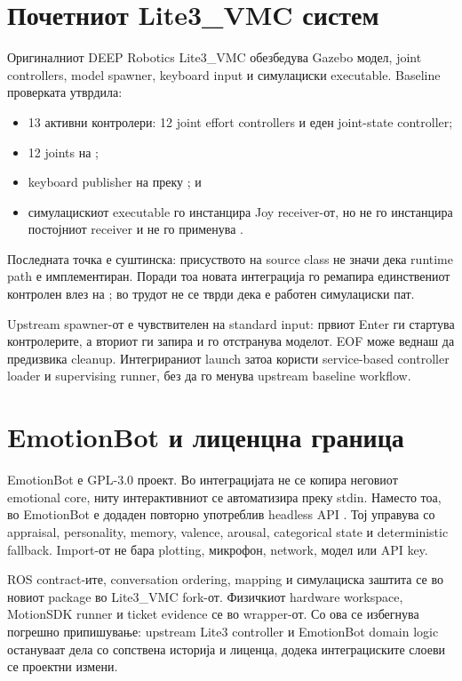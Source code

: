 \section{Почетниот Lite3\_VMC систем}

Оригиналниот DEEP Robotics Lite3\_VMC обезбедува Gazebo модел, joint
controllers, model spawner, keyboard input и симулациски executable. Baseline
проверката утврдила:

\begin{itemize}
  \item 13 активни контролери: 12 joint effort controllers и еден
  joint-state controller;
  \item 12 joints на ;
  \item keyboard publisher на  преку ; и
  \item симулацискиот executable го инстанцира Joy receiver-от, но не го
  инстанцира постојниот  receiver и не го применува
  .
\end{itemize}

Последната точка е суштинска: присуството на source class не значи дека
runtime path е имплементиран. Поради тоа новата интеграција го ремапира
единствениот контролен влез на ; во трудот не се
тврди дека  е работен симулациски пат.

Upstream spawner-от е чувствителен на standard input: првиот Enter ги стартува
контролерите, а вториот ги запира и го отстранува моделот. EOF може веднаш да
предизвика cleanup. Интегрираниот launch затоа користи service-based controller
loader и supervising runner, без да го менува upstream baseline workflow.

\section{EmotionBot и лиценцна граница}

EmotionBot е GPL-3.0 проект. Во интеграцијата не се копира неговиот emotional
core, ниту интерактивниот  се автоматизира преку stdin. Наместо
тоа, во EmotionBot е додаден повторно употреблив headless API
. Тој управува со appraisal,
personality, memory, valence, arousal, categorical state и deterministic
fallback. Import-от не бара plotting, микрофон, network, модел или API key.

ROS contract-ите, conversation ordering, mapping и симулациска заштита се во
новиот  package во Lite3\_VMC fork-от. Физичкиот
hardware workspace, MotionSDK runner и ticket evidence се во wrapper-от. Со
ова се избегнува погрешно припишување: upstream Lite3 controller и EmotionBot
domain logic остануваат дела со сопствена историја и лиценца, додека
интеграциските слоеви се проектни измени.

